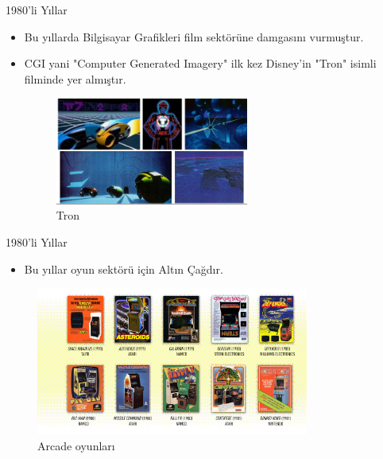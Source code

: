 \documentclass{beamer}
\begin{document}
\begin{frame}{1980'li Yıllar}
\begin{itemize}
\item Bu yıllarda Bilgisayar Grafikleri film sektörüne damgasını vurmuştur.
\item CGI yani "Computer Generated Imagery" ilk kez Disney'in "Tron" isimli filminde yer almıştır.

\begin{figure}
\includegraphics[width=0.6\textwidth]{tron.png}
\caption{Tron}
\end{figure}
\end{itemize}
\end{frame}

\begin{frame}{1980'li Yıllar}
\begin{itemize}
\item  Bu yıllar oyun sektörü için Altın Çağdır.
\end{itemize}
\begin{figure}
\includegraphics[width=0.8\textwidth]{arcade-timeline3.jpg}
\caption{Arcade oyunları}
\end{figure}
\end{frame}
\end{document}
